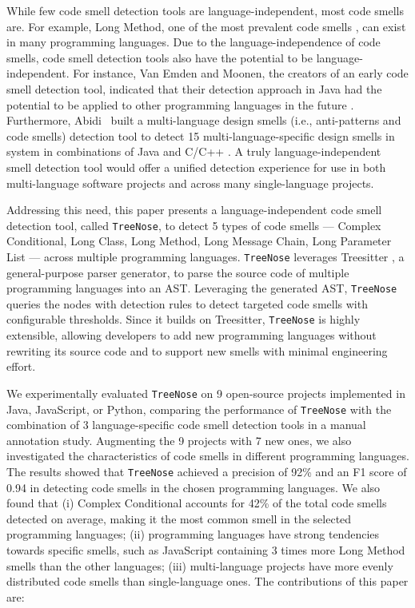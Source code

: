 While few code smell detection tools are language-independent, most code smells
are. For example, Long Method, one of the most prevalent code smells
\cite{developersCare}, can exist in many programming languages. Due to the
language-independence of code smells, code smell detection tools also have the
potential to be language-independent. For instance, Van Emden and Moonen, the
creators of an early code smell detection tool, indicated that their detection
approach in Java had the potential to be applied to other programming languages
in the future \cite{1173068}. Furthermore, Abidi~\etal{} built a multi-language
design smells (i.e., anti-patterns and code smells) detection tool to detect 15
multi-language-specific design smells in system in combinations of Java and
C/C++ \cite{MultiLanguageCodeSmells,Fault-Prone}. A truly language-independent
smell detection tool would offer a unified detection experience for use in both
multi-language software projects and across many single-language projects.


Addressing this need, this paper presents a language-independent code smell
detection tool, called \texttt{TreeNose}, to detect 5 types of code smells ---
Complex Conditional, Long Class, Long Method, Long Message Chain, Long Parameter
List --- across multiple programming languages. \texttt{TreeNose} leverages
Treesitter \cite{treeSitter}, a general-purpose parser generator, to parse the
source code of multiple programming languages into an AST. Leveraging the
generated AST, \texttt{TreeNose} queries the nodes with detection rules to
detect targeted code smells with configurable thresholds. Since it builds on
Treesitter, \texttt{TreeNose} is highly extensible, allowing developers to add
new programming languages without rewriting its source code and to support new
smells with minimal engineering effort.


We experimentally evaluated \texttt{TreeNose} on 9 open-source projects
implemented in Java, JavaScript, or Python, comparing the performance of
\texttt{TreeNose} with the combination of 3 language-specific code smell
detection tools in a manual annotation study. Augmenting the 9 projects with 7
new ones, we also investigated the characteristics of code smells in different
programming languages.
%
%
The results showed that \texttt{TreeNose} achieved a precision of 92\% and an F1
score of 0.94 in detecting code smells in the chosen programming languages. We
also found that (i) Complex Conditional accounts for 42\% of the total code
smells detected on average, making it the most common smell in the selected
programming languages; (ii) programming languages have strong tendencies towards
specific smells, such as JavaScript containing 3 times more Long Method smells
than the other languages; (iii) multi-language projects have more evenly
distributed code smells than single-language ones.
%
%
The contributions of this paper are:

